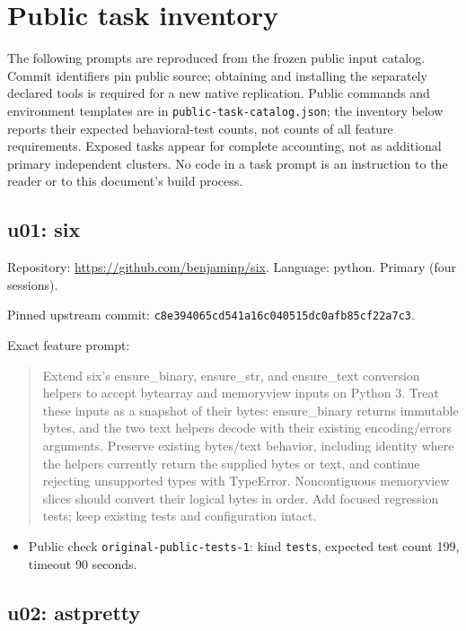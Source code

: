 \documentclass[manuscript,screen,nonacm]{acmart}
\providecommand{\tightlist}{\setlength{\itemsep}{0pt}\setlength{\parskip}{0pt}}
\begin{document}
\section{Public task inventory}\label{public-task-inventory}

The following prompts are reproduced from the frozen public input
catalog. Commit identifiers pin public source; obtaining and installing
the separately declared tools is required for a new native replication.
Public commands and environment templates are in
\nolinkurl{public-task-catalog.json}; the inventory below reports their
expected behavioral-test counts, not counts of all feature requirements.
Exposed tasks appear for complete accounting, not as additional primary
independent clusters. No code in a task prompt is an instruction to the
reader or to this document's build process.

\subsection{u01: six}\label{u01-six}

Repository: \url{https://github.com/benjaminp/six}. Language: python.
Primary (four sessions).

Pinned upstream commit:
\nolinkurl{c8e394065cd541a16c040515dc0afb85cf22a7c3}.

Exact feature prompt:

\begin{quote}
Extend six's ensure\_binary, ensure\_str, and ensure\_text conversion
helpers to accept bytearray and memoryview inputs on Python 3. Treat
these inputs as a snapshot of their bytes: ensure\_binary returns
immutable bytes, and the two text helpers decode with their existing
encoding/errors arguments. Preserve existing bytes/text behavior,
including identity where the helpers currently return the supplied bytes
or text, and continue rejecting unsupported types with TypeError.
Noncontiguous memoryview slices should convert their logical bytes in
order. Add focused regression tests; keep existing tests and
configuration intact.
\end{quote}

\begin{itemize}
\tightlist
\item
  Public check \nolinkurl{original-public-tests-1}: kind \texttt{tests},
  expected test count 199, timeout 90 seconds.
\end{itemize}

\subsection{u02: astpretty}\label{u02-astpretty}
\end{document}
